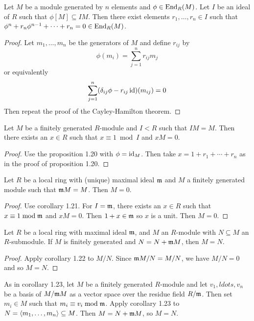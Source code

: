 \begin{prop}[1.20]
	Let $M$ be a module generated by $n$ elements and $\phi \in \operatorname{End}_R(M)$.
	Let $I$ be an ideal of $R$ such that $\phi[M] \subseteq IM$.
	Then there exist elements $r_1,\ldots,r_n \in I$ such that $\phi^n+r_n\phi^{n-1}+\cdots+r_n=0 \in \operatorname{End}_R(M)$.
\end{prop}

\begin{proof}
	Let $m_1,\ldots,m_n$ be the generators of $M$ and define $r_{ij}$ by
	\[\phi(m_i)=\sum_{j=1}^n r_{ij}m_j\]
	or equivalently
	\[\sum_{j=1}^n (\delta_{ij}\phi-r_{ij}\operatorname{id})(m_{ij})=0\]
	Then repeat the proof of the Cayley-Hamilton theorem.
\end{proof}	

\begin{cor}[1.21]
	Let $M$ be a finitely generated $R$-module and $I<R$ such that $IM=M$.
	Then there exists an $x \in R$ such that $x \equiv 1 \bmod I$ and $xM=0$.
\end{cor}

\begin{proof}
	Use the proposition 1.20 with $\phi=\operatorname{id}_M$.
	Then take $x=1+r_1+\cdots+r_n$ as in the proof of proposition 1.20.
\end{proof}

\begin{cor}
	Let $R$ be a local ring with (unique) maximal ideal $\mathfrak{m}$ and $M$ a finitely generated module such that $\mathfrak{m} M=M$.
	Then $M=0$.
\end{cor}

\begin{proof}
	Use corollary 1.21.
	For $I=\mathfrak{m}$, there exists an $x \in R$ such that $x \equiv 1 \bmod \mathfrak{m}$ and $xM=0$.
	Then $1+x \in \mathfrak{m}$ so $x$ is a unit.
	Then $M=0$.
\end{proof}

\begin{cor}[1.23]
	Let $R$ be a local ring with maximal ideal $\mathfrak{m}$, and $M$ an $R$-module with $N \subseteq M$ an $R$-submodule.
	If $M$ is finitely generated and $N=N+\mathfrak{m} M$, then $M=N$.
\end{cor}

\begin{proof}
	Apply corollary 1.22 to $M/N$.
	Since $\mathfrak{m} M/N=M/N$, we have $M/N=0$ and so $M=N$.
\end{proof}

\begin{rmk}
	As in corollary 1.23, let $M$ be a finitely generated $R$-module and let $v_1,ldots,v_n$ be a basis of $M/\mathfrak{m} M$ as a vector space over the residue field $R/\mathfrak{m}$.
	Then set $m_i \in M$ such that $m_i \equiv v_i \bmod \mathfrak{m}$.
	Apply corollary 1.23 to $N={\left\langle m_1,\ldots,m_n \right\rangle} \subseteq M$.
	Then $M=N+\mathfrak{m} M$, so $M=N$.
\end{rmk}

